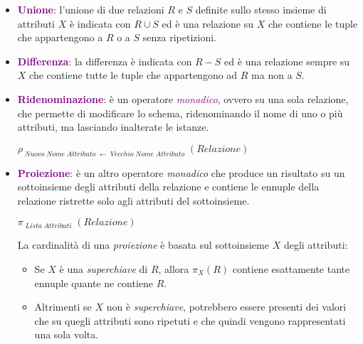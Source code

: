 \begin{itemize}
    \item \textbf{\textcolor{purple}{Unione}}: l'unione di due relazioni $R$ e $S$ definite
        sullo stesso insieme di attributi $X$ è indicata con $R \cup S$ ed è una relazione su $X$
        che contiene le tuple che appartengono a $R$ o a $S$ senza ripetizioni.
    \item \textbf{\textcolor{purple}{Differenza}}: la differenza è indicata con $R - S$ ed è una relazione sempre su
        $X$ che contiene tutte le tuple che appartengono ad $R$ ma non a $S$.
    \item \textbf{\textcolor{purple}{Ridenominazione}}: è un operatore \emph{\textcolor{purple}{monadico}}, ovvero su una sola relazione, che permette
        di modificare lo schema, ridenominando il nome di uno o più attributi, ma lasciando inalterate le istanze.
        \begin{center}
            $\rho_{\;Nuovo\;Nome\;Attributo\;\leftarrow\;Vecchio\;Nome\;Attributo}\;(Relazione)$
        \end{center}
    \item \textbf{\textcolor{purple}{Proiezione}}: è un altro operatore \emph{monadico} che produce un
        risultato su un sottoinsieme degli attributi della relazione e contiene le ennuple della
        relazione ristrette solo agli attributi del sottoinsieme.
        \begin{center}
            $\pi_{\;Lista\;Attributi}\;(Relazione)$
        \end{center}
        La cardinalità di una \emph{proiezione} è basata sul sottoinsieme $X$ degli
        attributi:
        \begin{itemize}
            \item Se $X$ è una \emph{superchiave} di $R$, allora $\pi_{X}(R)$ contiene esattamente
                tante ennuple quante ne contiene $R$.
            \item Altrimenti se $X$ non è \emph{superchiave}, potrebbero essere presenti dei valori che
                su quegli attributi sono ripetuti e che quindi vengono rappresentati una sola volta.
        \end{itemize}


\end{itemize}
